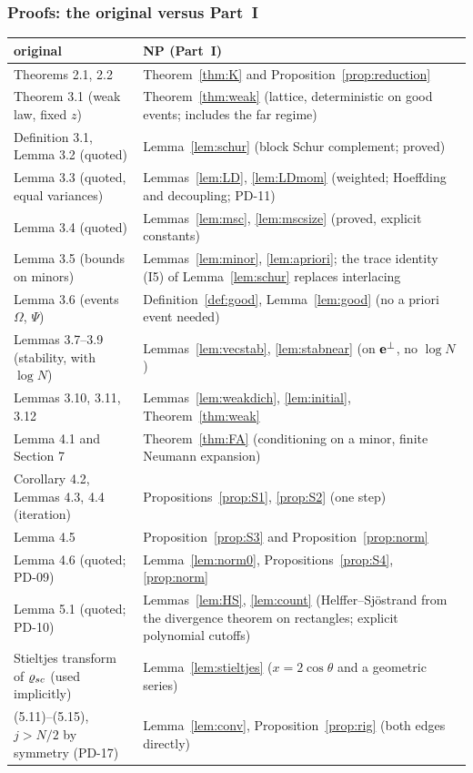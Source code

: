 \subsubsection*{Proofs: the original versus Part~I}\label{app:diffproofs}
\begin{center}
\renewcommand{\arraystretch}{1.1}\small
\begin{tabular}{|p{}|p{}|}
\hline
original & NP (Part~I)\\\hline
Theorems 2.1, 2.2 & Theorem~\ref{thm:K} and Proposition~\ref{prop:reduction}\\
Theorem 3.1 (weak law, fixed $z$) & Theorem~\ref{thm:weak} (lattice, deterministic on good events; includes the far regime)\\
Definition 3.1, Lemma 3.2 (quoted) & Lemma~\ref{lem:schur} (block Schur complement; proved)\\
Lemma 3.3 (quoted, equal variances) & Lemmas~\ref{lem:LD}, \ref{lem:LDmom} (weighted; Hoeffding and decoupling; PD-11)\\
Lemma 3.4 (quoted) & Lemmas~\ref{lem:msc}, \ref{lem:mscsize} (proved, explicit constants)\\
Lemma 3.5 (bounds on minors) & Lemmas~\ref{lem:minor}, \ref{lem:apriori}; the trace identity (I5) of Lemma~\ref{lem:schur} replaces interlacing\\
Lemma 3.6 (events $\Omega$, $\Psi$) & Definition~\ref{def:good}, Lemma~\ref{lem:good} (no a priori event needed)\\
Lemmas 3.7--3.9 (stability, with $\log N$) & Lemmas~\ref{lem:vecstab}, \ref{lem:stabnear} (on $\mathbf{e}^\perp$, no $\log N$)\\
Lemmas 3.10, 3.11, 3.12 & Lemmas~\ref{lem:weakdich}, \ref{lem:initial}, Theorem~\ref{thm:weak}\\
Lemma 4.1 and Section 7 & Theorem~\ref{thm:FA} (conditioning on a minor, finite Neumann expansion)\\
Corollary 4.2, Lemmas 4.3, 4.4 (iteration) & Propositions~\ref{prop:S1}, \ref{prop:S2} (one step)\\
Lemma 4.5 & Proposition~\ref{prop:S3} and Proposition~\ref{prop:norm}\\
Lemma 4.6 (quoted; PD-09) & Lemma~\ref{lem:norm0}, Propositions~\ref{prop:S4}, \ref{prop:norm}\\
Lemma 5.1 (quoted; PD-10) & Lemmas~\ref{lem:HS}, \ref{lem:count} (Helffer--Sj\"ostrand from the divergence theorem on rectangles; explicit polynomial cutoffs)\\
Stieltjes transform of $\varrho_{sc}$ (used implicitly) & Lemma~\ref{lem:stieltjes} ($x=2\cos\theta$ and a geometric series)\\
(5.11)--(5.15), $j>N/2$ by symmetry (PD-17) & Lemma~\ref{lem:conv}, Proposition~\ref{prop:rig} (both edges directly)\\\hline
\end{tabular}
\end{center}

